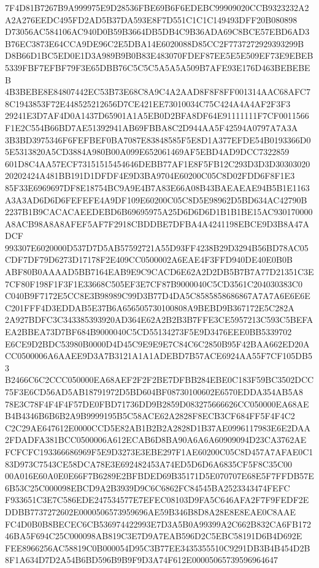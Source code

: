 \documentclass[UTF8,fontset=fandol,zihao=-4,a4paper]{ctexart}
\begin{document}
{{7F4D81B7267B9A999975E9D28536FBE69B6F6EDEBC99909020CCB9323232A2A2A276EEDC495FD2AD5B37DA593E8F7D551C1C1C149493DFF20B080898
D73056AC584106AC940D0B59B3664DB5DB4C9B36ADA69C8BCE57EBD6AD3B76EC3873E64CCA9DE96C2E5DBA14E6020088D85CC2F7737272929393299B
D8B66D1BC5ED0E1D3A989B9B0B83E483070FDEF87EE5E5E509EF73E9EBEB5339FBF7EFBF79F3E65DBB76C5C5C5A5A5A509B7AFE93E176D463BEBEBEB
4B3BEBE8E84807442EC53B73E68C8A9C4A2AAD8F8F8FF001314AAC68AFC78C1943853F72E448525212656D7CE421EE73010034C75C424A4A4AF2F3F3
29241E3D7AF4D0A1437D65901A1A5EB0D2BFA8DF64E91111111F7CF0011566F1E2C554B66BD7AE51392941AB69FBBA8C2D944AA5F42594A0797A7A3A
3B3BD3975346F6FEFBEF0BA7087E83848585F5E8D1A377EFDE54B0193366D05E5313820A5CD3884A980B00A099E652061469AF5EBD4AD9DCC7322859
601D8C4AA57ECF73151515454646DEBB77AF1E8F5FB12C293D3D3D3030302020202424A481BB191D1DFDF4E9D3BA9704E60200C05C8D02FDD6F8F1E3
85F33E6969697DF8E18754BC9A9E4B7A83E66A08B43BAEAEAE94B5B1E1163A3A3AD6D6D6FEFEFE4A9DF109E60200C05C8D5E98962D5BD634AC42790B
2237B1B9CACACAEEDEBD6B69695975A25D6D6D6D1B1B1BE15AC930170000A8ACB98A8A8AFEF5AF7F2918CBDDBE7DFBA4A4241198EBCE9D3B8A47ADCF
993307E6020000D537D7D5AB57592721A55D93FF4238B29D3294B56BD78AC05CDF7DF79D6273D17178F2E409CC0500002A6EAE4F3FFD940DE40E0B0B
ABF80B0AAAAD5BB7164EAB9E9C9CACD6E62A2D2DB5B7B7A77D21351C3E7CF80F198F1F3F1E33668C505EF3E7CF87B9000040C5CD3561C204030383C0
C040B9F7172E5CC8E3B98989C99D3B77D4DA5C8585858686867A7A7A6E6E6EC201FFF4D3EDDAB5E37B6A656505730100808A9BEBD9B367172E5C282A
2A927BDFC3C343385393920AD364E62A2B2B3B7FFE3CE5957213C593C5BEFAEA2BBEA73D7BF684B9000040C5CD55134273F5E9D3476EEE0BB5339702
E6CE9D2BDC53980B0000D4D45C9E9E9E7C84C6C2850B95F42BAA662ED20ACC0500006A6AAEE9D3A7B3121A1A1ADEBD7B57ACE6924AA55F7CF105DB53
B2466C6C2CCC050000EA68AEF2F2F2BE7DFBB284EBE0C183F59BC3502DCC75F3E6CD56AD5AB18791972D5BD604BF08730100602E6570EDDA354AB5A8
78E3C78F4F4F4F57DE0FBD71736DD9B2859D083275666626CC050000EA68AEB4B4346B6B6B2A9B9999195B5C58ACE62A2828F8ECB3CF684FF5F4F4C2
C2C29AE647612E0000CCD5E82AB1B2B2A2828D1B37AE0996117983E6E2DAA2FDADFA381BCC0500006A612ECAB6D8BA90A6A6A60909094D23CA3762AE
FCFCFC193366686969F5E9D3273E3EBE297F1AE60200C05C8D457A7AFAE0C183D973C7543CE58DCA78E3E692482453A74ED5D6D6A6835CF5F8C35C00
00A016E60A0E0E66F7B6289E2BFBDED69B35171D5E070707E68E5F7FFDB57E6B53C25C000098EBCD9A2B3939D9C6C6862FC84545BA2523343474FEFC
F933651C3E7C586EDE247534577E7EFEC08103D9FA5C646AFA2F7F9FEDF2EDDBB7737272602E0000506573959696AE59B346B8D8A28E8E8EAE0C8AAE
FC4D0B0B8BECEC6CB536974422993E7D3A5B0A99399A2C662B832CA6FB17246BA5F694C25C000098AB819C3E7D9A7EAB596D2C5EBC58191D6B4D692E
FEE8966256AC58819C0B000054D95C3B77EE3435355510C9291DB3B4B454D2B8F1A634D7D2A54B6BD596B9B9F9D3A74F612E00005065739596964647
}}
\end{document}
